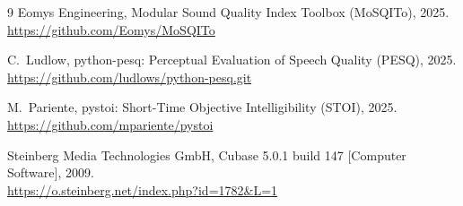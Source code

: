 \documentclass{article}
\begin{document}
\begin{thebibliography}{9}
Eomys Engineering, Modular Sound Quality Index Toolbox (MoSQITo), 2025. \\ 
\url{https://github.com/Eomys/MoSQITo}

C.~Ludlow, python-pesq: Perceptual Evaluation of Speech Quality (PESQ), 2025. \\
\url{https://github.com/ludlows/python-pesq.git}

M.~Pariente, pystoi: Short-Time Objective Intelligibility (STOI), 2025. \\
\url{https://github.com/mpariente/pystoi}

Steinberg Media Technologies GmbH, Cubase 5.0.1 build 147 [Computer Software], 2009. \\
\url{https://o.steinberg.net/index.php?id=1782&L=1}


\end{thebibliography}
\end{document}
